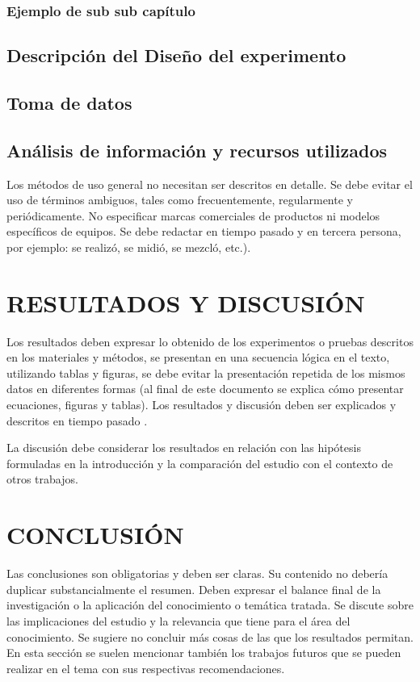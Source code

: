 \documentclass[twocolumn,10pt]{article}
\begin{document}
\subsubsection{Ejemplo de sub sub capítulo}
\subsection{Descripción del Diseño del experimento }
\subsection{Toma de datos}
\subsection{Análisis de información y recursos utilizados}

Los métodos de uso general no necesitan ser descritos en detalle. Se debe evitar el uso de términos ambiguos, tales como frecuentemente, regularmente y periódicamente. No especificar marcas comerciales de productos ni modelos específicos de equipos. Se debe redactar en tiempo pasado y en tercera persona, por ejemplo: se realizó, se midió, se mezcló, etc.).

\section{RESULTADOS Y DISCUSIÓN}

Los resultados deben expresar lo obtenido de los experimentos o pruebas descritos en los materiales y métodos, se presentan en una secuencia lógica en el texto, utilizando tablas y figuras, se debe evitar la presentación repetida de los mismos datos en diferentes formas (al final de este documento se explica cómo presentar ecuaciones, figuras y tablas). Los resultados y discusión deben ser explicados y descritos en tiempo pasado \cite{lewismodeling}.

La discusión debe considerar los resultados en relación con las hipótesis formuladas en la introducción y la comparación del estudio con el contexto de otros trabajos. 

\section{CONCLUSIÓN}

Las conclusiones son obligatorias y deben ser claras. Su contenido no debería duplicar substancialmente el resumen. Deben expresar el balance final de la investigación o la aplicación del conocimiento o temática tratada. Se discute sobre las implicaciones del estudio y la relevancia que tiene para el área del conocimiento. Se sugiere no concluir más cosas de las que los resultados permitan.  En esta sección se suelen mencionar también los trabajos futuros que se pueden realizar en el tema con sus respectivas recomendaciones.
\end{document}
